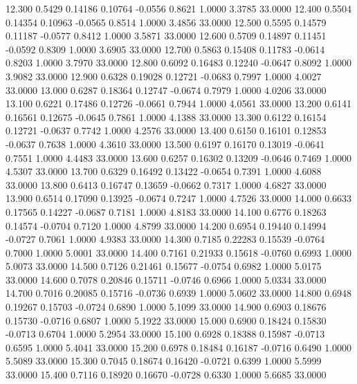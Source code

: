   12.300   0.5429   0.14186   0.10764  -0.0556   0.8621   1.0000   3.3785  33.0000
  12.400   0.5504   0.14354   0.10963  -0.0565   0.8514   1.0000   3.4856  33.0000
  12.500   0.5595   0.14579   0.11187  -0.0577   0.8412   1.0000   3.5871  33.0000
  12.600   0.5709   0.14897   0.11451  -0.0592   0.8309   1.0000   3.6905  33.0000
  12.700   0.5863   0.15408   0.11783  -0.0614   0.8203   1.0000   3.7970  33.0000
  12.800   0.6092   0.16483   0.12240  -0.0647   0.8092   1.0000   3.9082  33.0000
  12.900   0.6328   0.19028   0.12721  -0.0683   0.7997   1.0000   4.0027  33.0000
  13.000   0.6287   0.18364   0.12747  -0.0674   0.7979   1.0000   4.0206  33.0000
  13.100   0.6221   0.17486   0.12726  -0.0661   0.7944   1.0000   4.0561  33.0000
  13.200   0.6141   0.16561   0.12675  -0.0645   0.7861   1.0000   4.1388  33.0000
  13.300   0.6122   0.16154   0.12721  -0.0637   0.7742   1.0000   4.2576  33.0000
  13.400   0.6150   0.16101   0.12853  -0.0637   0.7638   1.0000   4.3610  33.0000
  13.500   0.6197   0.16170   0.13019  -0.0641   0.7551   1.0000   4.4483  33.0000
  13.600   0.6257   0.16302   0.13209  -0.0646   0.7469   1.0000   4.5307  33.0000
  13.700   0.6329   0.16492   0.13422  -0.0654   0.7391   1.0000   4.6088  33.0000
  13.800   0.6413   0.16747   0.13659  -0.0662   0.7317   1.0000   4.6827  33.0000
  13.900   0.6514   0.17090   0.13925  -0.0674   0.7247   1.0000   4.7526  33.0000
  14.000   0.6633   0.17565   0.14227  -0.0687   0.7181   1.0000   4.8183  33.0000
  14.100   0.6776   0.18263   0.14574  -0.0704   0.7120   1.0000   4.8799  33.0000
  14.200   0.6954   0.19440   0.14994  -0.0727   0.7061   1.0000   4.9383  33.0000
  14.300   0.7185   0.22283   0.15539  -0.0764   0.7000   1.0000   5.0001  33.0000
  14.400   0.7161   0.21933   0.15618  -0.0760   0.6993   1.0000   5.0073  33.0000
  14.500   0.7126   0.21461   0.15677  -0.0754   0.6982   1.0000   5.0175  33.0000
  14.600   0.7078   0.20846   0.15711  -0.0746   0.6966   1.0000   5.0334  33.0000
  14.700   0.7016   0.20085   0.15716  -0.0736   0.6939   1.0000   5.0602  33.0000
  14.800   0.6948   0.19267   0.15703  -0.0724   0.6890   1.0000   5.1099  33.0000
  14.900   0.6903   0.18676   0.15730  -0.0716   0.6807   1.0000   5.1922  33.0000
  15.000   0.6900   0.18424   0.15830  -0.0713   0.6704   1.0000   5.2954  33.0000
  15.100   0.6928   0.18388   0.15987  -0.0713   0.6595   1.0000   5.4041  33.0000
  15.200   0.6978   0.18484   0.16187  -0.0716   0.6490   1.0000   5.5089  33.0000
  15.300   0.7045   0.18674   0.16420  -0.0721   0.6399   1.0000   5.5999  33.0000
  15.400   0.7116   0.18920   0.16670  -0.0728   0.6330   1.0000   5.6685  33.0000
